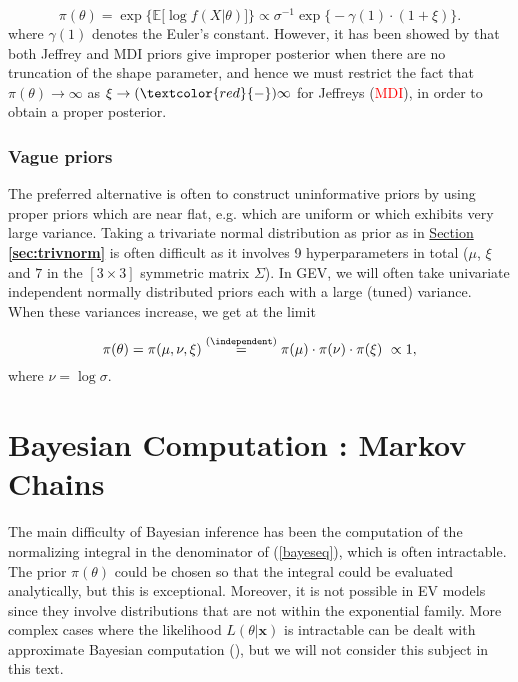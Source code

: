 \begin{equation*}
\pi(\theta)= \exp\Big\{ \mathbb{E}\big[\log f(X|\theta
)\big]\Big\} \propto \sigma^{-1}\exp\Big\{-\gamma(1)\cdot (1+\xi)\Big\}.
\end{equation*}
where $\gamma(1)$ denotes the Euler's constant.
However, it has been showed by \cite{northrop_posterior_2016} that 
both Jeffrey and MDI priors give improper posterior when there are no truncation of the shape parameter, and hence we must restrict the fact that $\pi(\theta)\rightarrow\infty$ as $\xi\rightarrow(\textcolor{red}{-})\infty$ for Jeffreys (\textcolor{red}{MDI}), in order to obtain a proper posterior.

\subsubsection*{Vague priors}
The preferred alternative is often to construct uninformative priors by using proper priors which are near flat, e.g. which are uniform or which exhibits very large variance.
Taking a trivariate normal distribution as prior as in \hyperref[sec:trivnorm]{Section \textbf{\ref{sec:trivnorm}}} is often difficult as it involves 9 hyperparameters in total ($\mu$, $\xi$ and $7$ in the $[3\times 3]$ symmetric matrix $\Sigma$).
In GEV, we will often take univariate independent normally distributed priors each with a large (tuned) variance. When these variances increase, we get at the limit

\begin{equation}\label{eq:vagprior}
\pi(\theta)=\pi(\mu,\nu,\xi)\stackrel{(\independent)}{=}\pi(\mu)\cdot\pi(\nu)\cdot\pi(\xi)\ \propto 1,
\end{equation}
where $\nu= \log\sigma$.



\section{Bayesian Computation : Markov Chains}\label{sec:baymcmc}

The main difficulty of Bayesian inference has been the computation of the normalizing integral in the denominator of (\ref{bayeseq}), which is often intractable. The prior $\pi(\theta)$ could be chosen so that the integral could be evaluated analytically, but this is exceptional. Moreover, it is not possible in EV models since they involve distributions that are not within the exponential family. 
More complex cases where the likelihood $L(\theta|\boldsymbol{x})$ is intractable can be dealt with approximate Bayesian computation (\citet{Beaumont2025}), but we will not consider this subject in this text.

